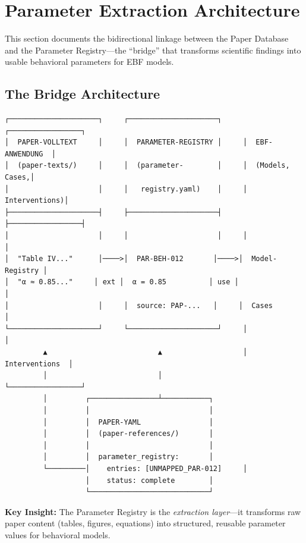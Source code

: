 
\section{Parameter Extraction Architecture}
\label{sec:paperint-parameter-extraction}

This section documents the bidirectional linkage between the Paper Database
and the Parameter Registry---the ``bridge'' that transforms scientific findings
into usable behavioral parameters for EBF models.

\subsection{The Bridge Architecture}

\begin{tcolorbox}[colback=blue!5!white, colframe=blue!75!black,
    title=Parameter Extraction: Paper $\rightarrow$ Registry $\rightarrow$ Models]

\begin{verbatim}
┌─────────────────────┐     ┌─────────────────────┐     ┌─────────────────┐
│  PAPER-VOLLTEXT     │     │  PARAMETER-REGISTRY │     │  EBF-ANWENDUNG  │
│  (paper-texts/)     │     │  (parameter-        │     │  (Models, Cases,│
│                     │     │   registry.yaml)    │     │   Interventions)│
├─────────────────────┤     ├─────────────────────┤     ├─────────────────┤
│                     │     │                     │     │                 │
│  "Table IV..."      │────>│  PAR-BEH-012       │────>│  Model-Registry │
│  "α ≈ 0.85..."     │ ext │  α = 0.85          │ use │                 │
│                     │     │  source: PAP-...   │     │  Cases          │
└─────────────────────┘     └─────────────────────┘     │                 │
         ▲                          ▲                   │  Interventions  │
         │                          │                   └─────────────────┘
         │         ┌────────────────┴───────────┐
         │         │                            │
         │         │  PAPER-YAML                │
         │         │  (paper-references/)       │
         │         │                            │
         │         │  parameter_registry:       │
         └─────────│    entries: [UNMAPPED_PAR-012]     │
                   │    status: complete        │
                   └────────────────────────────┘
\end{verbatim}

\textbf{Key Insight:} The Parameter Registry is the \textit{extraction layer}---it
transforms raw paper content (tables, figures, equations) into structured,
reusable parameter values for behavioral models.

\end{tcolorbox}

